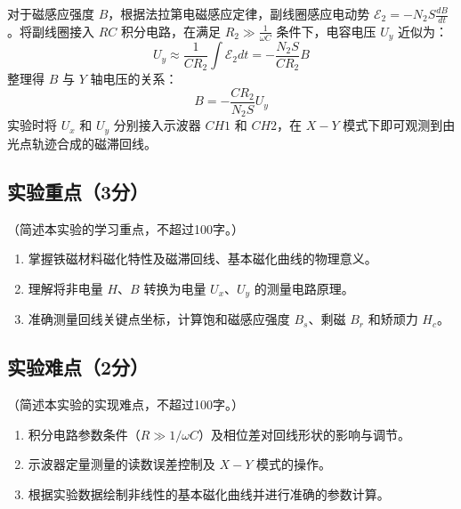 \documentclass{../template/Report}%
\begin{document}
对于磁感应强度 $B$，根据法拉第电磁感应定律，副线圈感应电动势 $\mathcal{E}_2 = -N_2 S \frac{dB}{dt}$。将副线圈接入 $RC$ 积分电路，在满足 $R_2 \gg \frac{1}{\omega C}$ 条件下，电容电压 $U_y$ 近似为：
\begin{equation}
    U_y \approx \frac{1}{C R_2} \int \mathcal{E}_2 dt = -\frac{N_2 S}{C R_2} B
\end{equation}
整理得 $B$ 与 $Y$ 轴电压的关系：
\begin{equation}
    B = -\frac{C R_2}{N_2 S} U_y
\end{equation}
实验时将 $U_x$ 和 $U_y$ 分别接入示波器 $CH1$ 和 $CH2$，在 $X-Y$ 模式下即可观测到由光点轨迹合成的磁滞回线。

\subsection{实验重点（3分）}
（简述本实验的学习重点，不超过100字。）

\begin{enumerate}
    \item 掌握铁磁材料磁化特性及磁滞回线、基本磁化曲线的物理意义。
    \item 理解将非电量 $H、B$ 转换为电量 $U_x、U_y$ 的测量电路原理。
    \item 准确测量回线关键点坐标，计算饱和磁感应强度 $B_s$、剩磁 $B_r$ 和矫顽力 $H_c$。
\end{enumerate}

\subsection{实验难点（2分）}
（简述本实验的实现难点，不超过100字。）

\begin{enumerate}
    \item 积分电路参数条件（$R \gg 1/\omega C$）及相位差对回线形状的影响与调节。
    \item 示波器定量测量的读数误差控制及 $X-Y$ 模式的操作。
    \item 根据实验数据绘制非线性的基本磁化曲线并进行准确的参数计算。
\end{enumerate}
\end{document}

